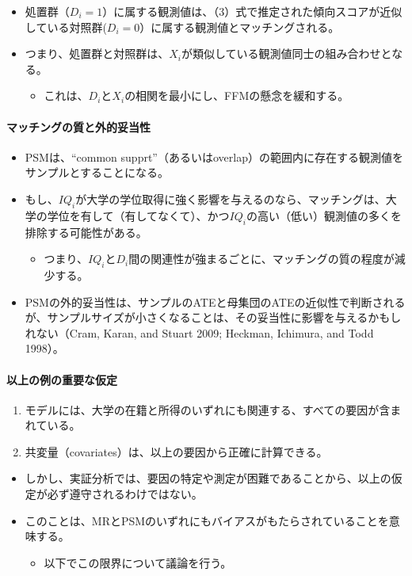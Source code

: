 \begin{itemize}
 \item 処置群（$D_i=1$）に属する観測値は、（3）式で推定された傾向スコアが近似している対照群($D_i=0$）に属する観測値とマッチングされる。
 \item つまり、処置群と対照群は、$X_i$が類似している観測値同士の組み合わせとなる。
  \begin{itemize}
   \item これは、$D_i$と$X_i$の相関を最小にし、FFMの懸念を緩和する。
  \end{itemize}
\end{itemize}

\paragraph{マッチングの質と外的妥当性}

\begin{itemize}
 \item PSMは、“common supprt”（あるいはoverlap）の範囲内に存在する観測値をサンプルとすることになる。
 \item もし、$IQ_i$が大学の学位取得に強く影響を与えるのなら、マッチングは、大学の学位を有して（有してなくて）、かつ$IQ_i$の高い（低い）観測値の多くを排除する可能性がある。
  \begin{itemize}
   \item つまり、$IQ_i$と$D_i$間の関連性が強まるごとに、マッチングの質の程度が減少する。
  \end{itemize}
 \item PSMの外的妥当性は、サンプルのATEと母集団のATEの近似性で判断されるが、サンプルサイズが小さくなることは、その妥当性に影響を与えるかもしれない（Cram, Karan, and Stuart 2009; Heckman, Ichimura, and Todd 1998）。
\end{itemize}
 
\paragraph{以上の例の重要な仮定}

\begin{enumerate}
 \item モデルには、大学の在籍と所得のいずれにも関連する、すべての要因が含まれている。
 \item 共変量（covariates）は、以上の要因から正確に計算できる。
\end{enumerate}
\begin{itemize}
 \item しかし、実証分析では、要因の特定や測定が困難であることから、以上の仮定が必ず遵守されるわけではない。
 \item このことは、MRとPSMのいずれにもバイアスがもたらされていることを意味する。
  \begin{itemize}
   \item 以下でこの限界について議論を行う。
  \end{itemize}
\end{itemize}

